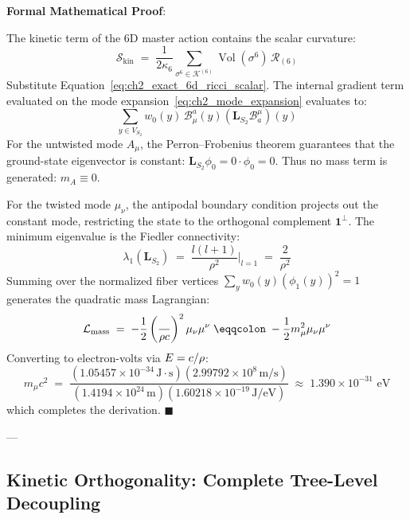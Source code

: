 \documentclass[
    12pt,
    a4paper,
    headings=normal,
    twoside=false,
    open=any,
    parskip=half
]{scrbook}
\let\hbar\relax
\DeclareMathOperator{\vol}{Vol}
\newenvironment{myproof}[1][]{%
  \par\vspace{6pt}\noindent\textbf{\sffamily\color{maincolor}Formal Mathematical Proof\ifstrempty{#1}{}{ (#1)}}:\par\nopagebreak
}{%
  \penalty50\hfill\ensuremath{\blacksquare}\par\vspace{6pt}
}
\begin{document}
\begin{myproof}
The kinetic term of the 6D master action contains the scalar curvature:
\begin{equation*}
\mathcal{S}_{\text{kin}} \;=\; \frac{1}{2\kappa_6} \sum_{\sigma^6 \in \mathcal{K}^{(6)}} \vol(\sigma^6) \, \mathcal{R}_{(6)}
\end{equation*}
Substitute Equation~\eqref{eq:ch2_exact_6d_ricci_scalar}. The internal gradient term evaluated on the mode expansion~\eqref{eq:ch2_mode_expansion} evaluates to:
\begin{equation*}
\sum_{y \in V_{S_2}} w_0(y) \, \mathcal{B}_\mu^a(y) \left( \mathbf{L}_{S_2} \mathcal{B}_a^\mu \right)(y)
\end{equation*}
For the untwisted mode $A_\mu$, the Perron--Frobenius theorem guarantees that the ground-state eigenvector is constant: $\mathbf{L}_{S_2} \phi_0 = 0 \cdot \phi_0 = 0$. Thus no mass term is generated: $m_A \equiv 0$.

For the twisted mode $\mu_\nu$, the antipodal boundary condition projects out the constant mode, restricting the state to the orthogonal complement $\mathbf{1}^\perp$. The minimum eigenvalue is the Fiedler connectivity:
\begin{equation*}
\lambda_1\left( \mathbf{L}_{S_2} \right) \;=\; \frac{l(l + 1)}{\rho^2} \Bigg|_{l=1} \;=\; \frac{2}{\rho^2}
\end{equation*}
Summing over the normalized fiber vertices $\sum_y w_0(y) (\phi_1(y))^2 = 1$ generates the quadratic mass Lagrangian:
\begin{equation*}
\mathcal{L}_{\text{mass}} \;=\; -\frac{1}{2} \left( \frac{\hbar}{\rho c} \right)^2 \mu_\nu \mu^\nu \;\eqqcolon\; -\frac{1}{2} m_\mu^2 \mu_\nu \mu^\nu
\end{equation*}
Converting to electron-volts via $E = \hbar c / \rho$:
\begin{equation*}
m_\mu c^2 \;=\; \frac{(1.05457 \times 10^{-34} \, \text{J}\cdot\text{s})(2.99792 \times 10^8 \, \text{m/s})}{(1.4194 \times 10^{24} \, \text{m})(1.60218 \times 10^{-19} \, \text{J/eV})} \;\approx\; 1.390 \times 10^{-31} \text{ eV}
\end{equation*}
which completes the derivation.
\end{myproof}

---

\subsection{Kinetic Orthogonality: Complete Tree-Level Decoupling}
\end{document}
